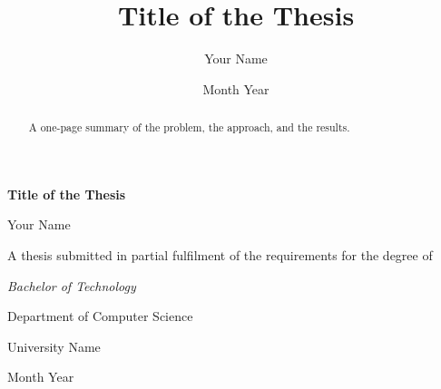 \documentclass[12pt, a4paper, oneside]{report}
\title{Title of the Thesis}
\author{Your Name}
\date{Month Year}
\begin{document}
\hypersetup{pageanchor=false}
\begin{titlepage}
  \centering
  \vspace*{3cm}
  {\Huge\bfseries Title of the Thesis\par}
  \vspace{1.5cm}
  {\Large Your Name\par}
  \vfill
  A thesis submitted in partial fulfilment of the requirements for the degree of\par
  \textit{Bachelor of Technology}\par
  \vspace{1cm}
  Department of Computer Science\par
  University Name\par
  \vspace{1cm}
  Month Year
\end{titlepage}

\begin{abstract}
A one-page summary of the problem, the approach, and the results.
\end{abstract}
\hypersetup{pageanchor=true}

\tableofcontents
\listoffigures
\listoftables

\clearpage
{}






\end{document}
